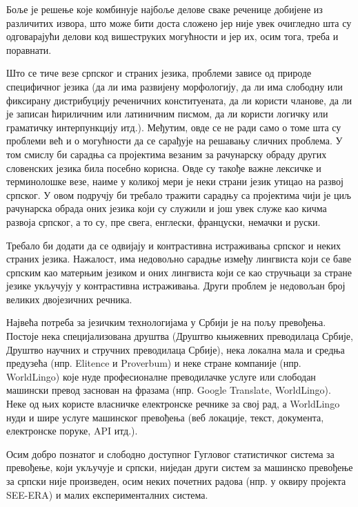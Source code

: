\begin{multicols}{2}
Боље је решење које комбинује најбоље делове сваке реченице добијене из различитих извора, што може бити доста сложено јер није увек очигледно шта су одговарајући делови код вишеструких могућности и јер их, осим тога, треба и поравнати. 


Што се тиче везе српског и страних језика, проблеми зависе од природе специфичног језика (да ли има развијену морфологију, да ли има слободну или фиксирану дистрибуцију реченичних конституената, да ли користи чланове, да ли је записан ћириличним или латиничним писмом, да ли користи логичку или граматичку интерпункцију итд.). Међутим, овде се не ради само о томе шта су проблеми већ и о могућности да се сарађује на решавању сличних проблема. У том смислу би сарадња са пројектима везаним за рачунарску обраду других словенских језика била посебно корисна. Овде су такође важне лексичке и терминолошке везе, наиме у коликој мери је неки страни језик утицао на развој српског. У овом подручју би требало тражити сарадњу са пројектима чији је циљ рачунарска обрада оних језика који су служили и још увек служе као кичма развоја српског, а то су, пре свега, енглески, француски, немачки и руски.

Требало би додати да се одвијају и контрастивна истраживања српског и неких страних језика. Нажалост, има недовољно сарадње између лингвиста који се баве српским као матерњим језиком и оних лингвиста који се као стручњаци за стране језике укључују у контрастивна истраживања. Други проблем је недовољан број великих двојезичних речника. 

Највећа потреба за језичким технологијама у Србији је на пољу превођења. Постоје нека специјализована друштва (Друштво књижевних преводилаца Србије, Друштво научних и стручних преводилаца Србије), нека локална мала и средња предузећа (нпр. Elitence и Proverbum) и неке стране компаније (нпр. World\-Lingo) које нуде професионалне преводилачке услуге или слободан машински превод заснован на фразама (нпр. Google Translate, World\-Lingo). Неке од њих користе власничке електронске речнике за свој рад, а World\-Lingo нуди и шире услуге машинског превођења (веб локације, текст, документа, електронске поруке, API итд.).

Осим добро познатог и слободно доступног Гугловог статистичког система за превођење, који укључује и српски, ниједан други систем за машинско превођење за српски није произведен, осим неких почетних радова (нпр. у оквиру пројекта SEE-ERA) и малих експерименталних система.


\end{multicols}
